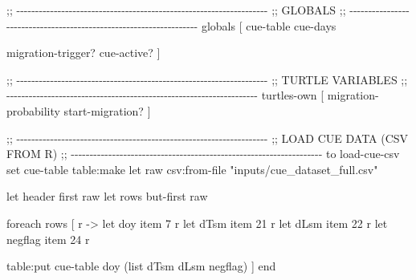 \documentclass[
]{book}
\newenvironment{Shaded}{\begin{snugshade}}{\end{snugshade}}
\newcommand{\NormalTok}[1]{#1}
\begin{document}
\begin{Shaded}
\begin{Highlighting}[]
\NormalTok{;; {-}{-}{-}{-}{-}{-}{-}{-}{-}{-}{-}{-}{-}{-}{-}{-}{-}{-}{-}{-}{-}{-}{-}{-}{-}{-}{-}{-}{-}{-}{-}{-}{-}{-}{-}{-}{-}{-}{-}{-}{-}{-}{-}{-}{-}{-}{-}{-}{-}{-}{-}{-}{-}{-}{-}{-}{-}{-}{-}{-}{-}{-}{-}{-}{-}{-}{-}}
\NormalTok{;;  GLOBALS}
\NormalTok{;; {-}{-}{-}{-}{-}{-}{-}{-}{-}{-}{-}{-}{-}{-}{-}{-}{-}{-}{-}{-}{-}{-}{-}{-}{-}{-}{-}{-}{-}{-}{-}{-}{-}{-}{-}{-}{-}{-}{-}{-}{-}{-}{-}{-}{-}{-}{-}{-}{-}{-}{-}{-}{-}{-}{-}{-}{-}{-}{-}{-}{-}{-}{-}{-}{-}{-}{-}}
\NormalTok{globals [}
\NormalTok{  cue{-}table}
\NormalTok{  cue{-}days}

\NormalTok{  migration{-}trigger?}
\NormalTok{  cue{-}active?}
\NormalTok{]}

\NormalTok{;; {-}{-}{-}{-}{-}{-}{-}{-}{-}{-}{-}{-}{-}{-}{-}{-}{-}{-}{-}{-}{-}{-}{-}{-}{-}{-}{-}{-}{-}{-}{-}{-}{-}{-}{-}{-}{-}{-}{-}{-}{-}{-}{-}{-}{-}{-}{-}{-}{-}{-}{-}{-}{-}{-}{-}{-}{-}{-}{-}{-}{-}{-}{-}{-}{-}{-}{-}}
\NormalTok{;;  TURTLE VARIABLES}
\NormalTok{;; {-}{-}{-}{-}{-}{-}{-}{-}{-}{-}{-}{-}{-}{-}{-}{-}{-}{-}{-}{-}{-}{-}{-}{-}{-}{-}{-}{-}{-}{-}{-}{-}{-}{-}{-}{-}{-}{-}{-}{-}{-}{-}{-}{-}{-}{-}{-}{-}{-}{-}{-}{-}{-}{-}{-}{-}{-}{-}{-}{-}{-}{-}{-}{-}{-}{-}{-}}
\NormalTok{turtles{-}own [}
\NormalTok{  migration{-}probability}
\NormalTok{  start{-}migration?}
\NormalTok{]}

\NormalTok{;; {-}{-}{-}{-}{-}{-}{-}{-}{-}{-}{-}{-}{-}{-}{-}{-}{-}{-}{-}{-}{-}{-}{-}{-}{-}{-}{-}{-}{-}{-}{-}{-}{-}{-}{-}{-}{-}{-}{-}{-}{-}{-}{-}{-}{-}{-}{-}{-}{-}{-}{-}{-}{-}{-}{-}{-}{-}{-}{-}{-}{-}{-}{-}{-}{-}{-}{-}}
\NormalTok{;;  LOAD CUE DATA (CSV FROM R)}
\NormalTok{;; {-}{-}{-}{-}{-}{-}{-}{-}{-}{-}{-}{-}{-}{-}{-}{-}{-}{-}{-}{-}{-}{-}{-}{-}{-}{-}{-}{-}{-}{-}{-}{-}{-}{-}{-}{-}{-}{-}{-}{-}{-}{-}{-}{-}{-}{-}{-}{-}{-}{-}{-}{-}{-}{-}{-}{-}{-}{-}{-}{-}{-}{-}{-}{-}{-}{-}{-}}
\NormalTok{to load{-}cue{-}csv}
\NormalTok{  set cue{-}table table:make}
\NormalTok{  let raw csv:from{-}file "inputs/cue\_dataset\_full.csv"}

\NormalTok{  let header first raw}
\NormalTok{  let rows but{-}first raw}

\NormalTok{  foreach rows [}
\NormalTok{    r {-}\textgreater{}}
\NormalTok{      let doy     item 7  r}
\NormalTok{      let dTsm    item 21 r}
\NormalTok{      let dLsm    item 22 r}
\NormalTok{      let negflag item 24 r}

\NormalTok{      table:put cue{-}table doy (list dTsm dLsm negflag)}
\NormalTok{  ]}
\NormalTok{end}


\end{Highlighting}
\end{Shaded}
\end{document}
